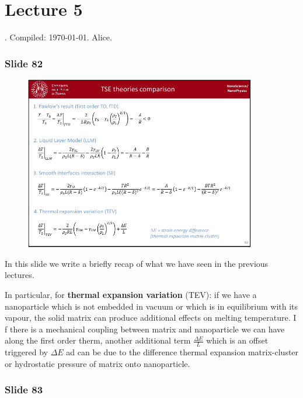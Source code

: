 \documentclass[../main/main.tex]{subfiles}
\begin{document}
\section{Lecture 5}
 . Compiled:  \today. Alice.
 

\subsubsection{Slide 82}

\begin{figure}[h!]
\centering
\includegraphics[page=1,width=0.9\textwidth]{../lessons/pdf_file/5_lesson.pdf}
\end{figure}


In this slide we write a briefly recap of what we have seen in the previous lectures.

In particular, for \textbf{thermal expansion variation} (TEV): if we have a nanoparticle which is not embedded in vacuum or which is in equilibrium with its vapour, the solid matrix can produce additional effects on melting temperature. I f there is a mechanical coupling between matrix and nanoparticle we can have along the first order therm, another additional term  \( \frac{\Delta E}{L} \) which is an offset triggered by \( \Delta E \) ad can be due to the difference thermal expansion matrix-cluster or hydrostatic pressure of matrix onto nanoparticle.


\newpage

\subsubsection{Slide 83}
\end{document}
